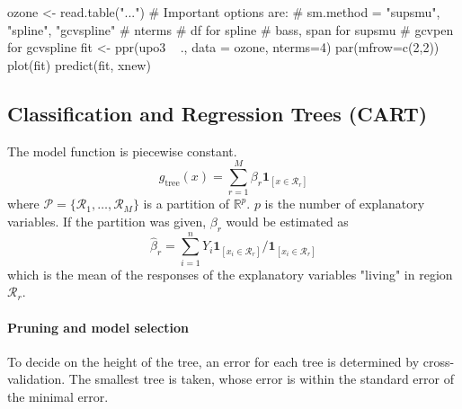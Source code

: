 \begin{code}
 ozone <- read.table("...")
 # Important options are:
 # sm.method = {"supsmu", "spline", "gcvspline"}
 # nterms
 # df for spline
 # bass, span for supsmu
 # gcvpen for gcvspline
 fit <- ppr(upo3 ~ ., data = ozone, nterms=4)
 par(mfrow=c(2,2))
 plot(fit)
 predict(fit, xnew)
\end{code}

\subsection{Classification and Regression Trees (CART)}
\begin{theory}
 The model function is piecewise constant.
 \begin{equation*}
  g_{\text{tree}}(x) = \sum_{r=1}^M \beta_r \mathbf{1}_{[x\in\mathcal{R}_r]}
 \end{equation*}
 where $\mathcal{P} = \{\mathcal{R}_1, \dotsc, \mathcal{R}_M\}$ is a partition of $\mathbb{R}^p$. $p$ is the number of explanatory variables.
 If the partition was given, $\beta_r$ would be estimated as
 \begin{equation*}
  \hat{\beta}_r = \sum_{i=1}^n Y_i \mathbf{1}_{[x_i\in\mathcal{R}_r]} / \mathbf{1}_{[x_i\in\mathcal{R}_r]}
 \end{equation*}
 which is the mean of the responses of the explanatory variables "living" in region $\mathcal{R}_r$.
 \paragraph{Pruning and model selection}
 To decide on the height of the tree, an error for each tree is determined by cross-validation.
 The smallest tree is taken, whose error is within the standard error of the minimal error.
 \end{theory}

